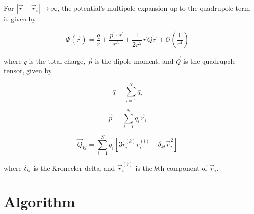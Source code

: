 \documentclass[12pt,a4paper,twoside]{article}
\begin{document}
For $|\vec{r} - \vec{r}_i| \rightarrow \infty$, the potential's multipole expansion up to the quadrupole term is given by \cite{gradshteyn}

\begin{equation}\label{eq:multipole}
	\Phi(\vec{r}) = \frac{q}{r} + \frac{\vec{p} \cdot \vec{r}}{r^3} + \frac{1}{2r^5}\vec{r}\vec{Q}\vec{r} + \mathcal{O}\left(\frac{1}{r^4}\right)
\end{equation}

where $q$ is the total charge, $\vec{p}$ is the dipole moment, and $\vec{Q}$ is the quadrupole tensor, given by

\begin{equation}\label{eq:charge}
	q = \sum_{i=1}^N q_i
\end{equation}

\begin{equation}\label{eq:dipole}
	\vec{p} = \sum_{i=1}^N q_i \vec{r}_i
\end{equation}

\begin{equation}\label{eq:quadrupole}
	\vec{Q}_{kl} = \sum_{i=1}^N q_i \left[ 3r_i^{(k)}r_i^{(l)} - \delta_{kl}\vec{r}_i^2 \right]
\end{equation}

where $\delta_{kl}$ is the Kronecker delta, and $\vec{r}_i^{(k)}$ is the $k$th component of $\vec{r}_i$.

\section{Algorithm}
\label{sec:Algo}
\medskip
\end{document}
